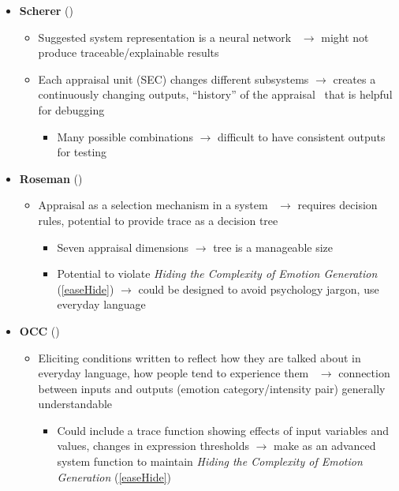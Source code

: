 \begin{itemize}
    \item \textbf{Scherer} (\weak)
    \begin{itemize}
        \item Suggested system representation is a neural
        network~\citep[p.~105]{scherer2001appraisalB} $\rightarrow$ might not
        produce traceable/explainable results

        \item Each appraisal unit (SEC) changes different subsystems
        $\rightarrow$ creates a continuously changing outputs, ``history'' of
        the appraisal~\citep[p.~107]{scherer2001appraisalB} that is helpful for
        debugging
        \begin{itemize}
            \item Many possible combinations $\rightarrow$ difficult to have
            consistent outputs for testing
        \end{itemize}
    \end{itemize}

    \item \textbf{Roseman} (\strong)
    \begin{itemize}
        \item Appraisal as a selection mechanism in a system~\citep[p.~76,
        81--83]{roseman2001model} $\rightarrow$ requires decision rules,
        potential to provide trace as a decision tree
        \begin{itemize}
            \item Seven appraisal dimensions $\rightarrow$ tree is a manageable
            size

            \item Potential to violate \textit{Hiding the Complexity of Emotion
                Generation} (\ref{easeHide}) $\rightarrow$ could be designed to
            avoid psychology jargon, use everyday language
        \end{itemize}
    \end{itemize}

    \item \textbf{OCC} (\strong)
    \begin{itemize}
        \item Eliciting conditions written to reflect how they are talked
        about in everyday language, how people tend to experience
        them~\citep[p.~25--26]{clore2000cognition} $\rightarrow$ connection
        between inputs and outputs (emotion category/intensity pair) generally
        understandable
        \begin{itemize}
            \item Could include a trace function showing effects of input
            variables and values, changes in expression thresholds
            $\rightarrow$ make as an advanced system function to maintain
            \textit{Hiding the Complexity of Emotion Generation}
            (\ref{easeHide})
        \end{itemize}
    \end{itemize}


\end{itemize}
